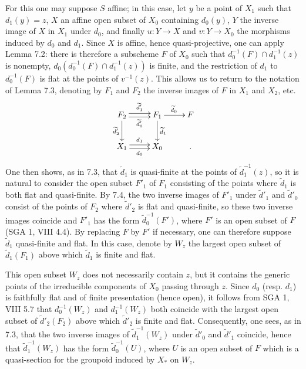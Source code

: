 For this one may suppose $S$ affine; in this case, let $y$ be a point of $X_1$ such that $d_1(y)=z$, $X$ an affine open subset of $X_0$ containing $d_0(y)$, $Y$ the inverse image of $X$ in $X_1$ under $d_0$, and finally $u:Y\to X$ and $v:Y\to X_0$ the morphisms induced by $d_0$ and $d_1$. Since $X$ is affine, hence quasi-projective, one can apply Lemma 7.2: there is therefore a subscheme $F$ of $X_0$ such that $d_0^{-1}(F)\cap d_1^{-1}(z)$ is nonempty, $d_0(d_0^{-1}(F)\cap d_1^{-1}(z))$ is finite, and the restriction of $d_1$ to $d_0^{-1}(F)$ is flat at the points of $v^{-1}(z)$. This allows us to return to the notation of Lemma 7.3, denoting by $F_1$ and $F_2$ the inverse images of $F$ in $X_1$ and $X_2$, etc.
\[
\xymatrix{F_2\ar@<.5ex>[r]^{\widetilde d'_1}\ar@<-.5ex>[r]_{\widetilde d'_0}\ar[d]_{\widetilde d'_2}&F_1\ar[r]^{\widetilde d_0}\ar[d]^{\widetilde d_1}&F\\X_1\ar@<.5ex>[r]^{d_1}\ar@<-.5ex>[r]_{d_0}&X_0&.}
\]
One then shows, as in 7.3, that $\widetilde d_1$ is quasi-finite at the points of $\widetilde d_1^{-1}(z)$, so it is natural to consider the open subset $F'_1$ of $F_1$ consisting of the points where $\widetilde d_1$ is both flat and quasi-finite. By 7.4, the two inverse images of $F'_1$ under $\widetilde d'_1$ and $\widetilde d'_0$ consist of the points of $F_2$ where $\widetilde d'_2$ is flat and quasi-finite, so these two inverse images coincide and $F'_1$ has the form $\widetilde d_0^{-1}(F')$, where $F'$ is an open subset of $F$ (SGA 1, VIII 4.4). By replacing $F$ by $F'$ if necessary, one can therefore suppose $\widetilde d_1$ quasi-finite and flat. In this case, denote by $W_z$ the largest open subset of $\widetilde d_1(F_1)$ above which $\widetilde d_1$ is finite and flat.

This open subset $W_z$ does not necessarily contain $z$, but it contains the generic points of the irreducible components of $X_0$ passing through $z$. Since $d_0$ (resp. $d_1$) is faithfully flat and of finite presentation (hence open), it follows from SGA 1, VIII 5.7 that $d_0^{-1}(W_z)$ and $d_1^{-1}(W_z)$ both coincide with the largest open subset of $\widetilde d'_2(F_2)$ above which $\widetilde d'_2$ is finite and flat. Consequently, one sees, as in 7.3, that the two inverse images of $\widetilde d_1^{-1}(W_z)$ under $\widetilde d'_0$ and $\widetilde d'_1$ coincide, hence that $\widetilde d_1^{-1}(W_z)$ has the form $\widetilde d_0^{-1}(U)$, where $U$ is an open subset of $F$ which is a quasi-section for the groupoid induced by $X_*$ on $W_z$.

